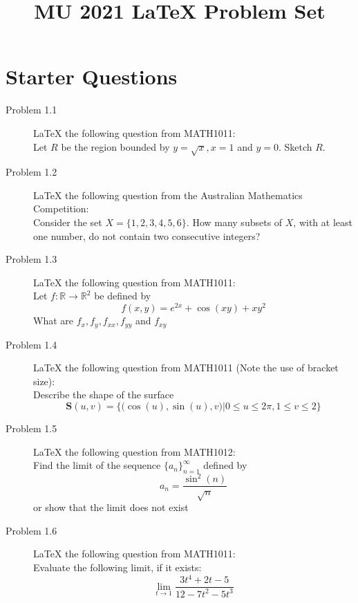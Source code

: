 \documentclass{article}
\title{MU 2021 \LaTeX{} Problem Set}
\begin{document}
\maketitle
\section{Starter Questions}
\begin{description}
    \item[Problem 1.1] \LaTeX{} the following question from MATH1011:\\
    Let $R$ be the region bounded by $y = \sqrt{x},x=1$ and $y=0$. Sketch $R$.
    \item[Problem 1.2] \LaTeX{} the following question from the Australian Mathematics Competition:\\
    Consider the set $X=\{1,2,3,4,5,6\}$. How many subsets of $X$, with at least one number, do not contain two consecutive integers?
    \item[Problem 1.3] \LaTeX{} the following question from MATH1011:\\
    Let $f:\mathbb{R}\to\mathbb{R}^2$ be defined by
    \[f(x,y)=e^{2x}+\cos(xy)+xy^2\]
    What are $f_x,f_y,f_{xx},f_{yy}$ and $f_{xy}$
    \item[Problem 1.4] \LaTeX{} the following question from MATH1011 (Note the use of bracket size):\\
    Describe the shape of the surface
    \[\mathbf{S}(u,v)=\Big\{\big(\cos(u),\sin(u),v\big)|0\leq u\leq 2\pi,1\leq v\leq 2\Big\}\]
    \item[Problem 1.5] \LaTeX{} the following question from MATH1012:\\
    Find the limit of the sequence $\{a_n\}^\infty_{n=1}$ defined by
    \[a_n=\frac{\sin^2(n)}{\sqrt{n}}\]
    or show that the limit does not exist
    \item[Problem 1.6] \LaTeX{} the following question from MATH1011:\\
    Evaluate the following limit, if it exists:
    \[\lim_{t\to1}\frac{3t^4+2t-5}{12-7t^2-5t^3}\]
\end{description}
\end{document}
